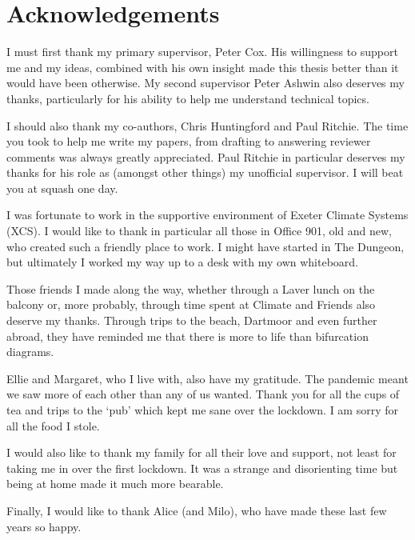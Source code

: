 \chapter{Acknowledgements}

I must first thank my primary supervisor, Peter Cox. His willingness to support me and my ideas, combined with his own insight
made this thesis better than it would have been otherwise. My second supervisor Peter Ashwin also deserves my thanks,
particularly for his ability to help me understand technical topics.

I should also thank my co-authors, Chris Huntingford and Paul Ritchie. The time you took to help me
write my papers, from drafting to answering reviewer comments was always greatly appreciated. Paul Ritchie
in particular deserves my thanks for his role as (amongst other things) my unofficial supervisor. I will beat you
at squash one day.

I was fortunate to work in the supportive environment of Exeter Climate Systems (XCS). I would like to thank in particular
all those in Office 901, old and new, who created such a friendly place to work. I might have started in The Dungeon,
but ultimately I worked my way up to a desk with my own whiteboard.

Those friends I made along the way, whether through a Laver lunch on the balcony or, more probably, through time spent at Climate and
Friends also deserve my thanks. Through trips to the beach, Dartmoor and even further abroad, they have reminded me that there is more to life
than bifurcation diagrams.

Ellie and Margaret, who I live with, also have my gratitude. The pandemic meant we saw more of each other than any of us wanted.
Thank you for all the cups of tea and trips to the `pub' which kept me sane over the lockdown. I am sorry for
all the food I stole.

I would also like to thank my family for all their love and support, not least for taking me in over the first lockdown.
It was a strange and disorienting time but being at home made it much more bearable.

Finally, I would like to thank Alice (and Milo), who have made these last few years so happy.
